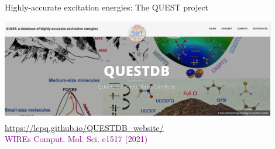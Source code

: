 \documentclass[aspectratio=169,9pt]{beamer}
\newcommand{\pub}[1]{{\small \textcolor{purple}{#1}}}
\begin{document}
\begin{frame}{Highly-accurate excitation energies: The QUEST project}
        \begin{center}
                \includegraphics[width=0.9\textwidth]{fig/TOC_QUEST}
                \\
                \bigskip
                \url{https://lcpq.github.io/QUESTDB_website/}
                \\
                \bigskip
		\pub{WIREs Comput. Mol. Sci. e1517 (2021)}
        \end{center}
\end{frame}
\end{document}
